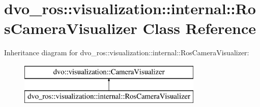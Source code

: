 \hypertarget{classdvo__ros_1_1visualization_1_1internal_1_1_ros_camera_visualizer}{}\section{dvo\+\_\+ros\+:\+:visualization\+:\+:internal\+:\+:Ros\+Camera\+Visualizer Class Reference}
\label{classdvo__ros_1_1visualization_1_1internal_1_1_ros_camera_visualizer}
Inheritance diagram for dvo\+\_\+ros\+:\+:visualization\+:\+:internal\+:\+:Ros\+Camera\+Visualizer\+:\begin{figure}[H]
\begin{center}
\leavevmode
\includegraphics[height=2.000000cm]{classdvo__ros_1_1visualization_1_1internal_1_1_ros_camera_visualizer}
\end{center}
\end{figure}
